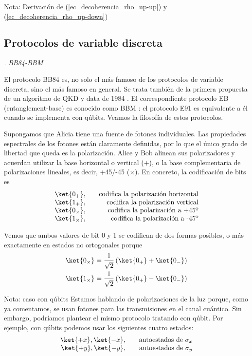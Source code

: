 \documentclass[a4paper,11pt]{book} %
\numberwithin{equation}{chapter}
\def\lp{\left(}
\def\rp{\right)}
\def\subsubiContadorIt{\par\addtocounter{subsubsection}{1}\underline{\it\thesubsubsection.}\hskip0.5cm \setcounter{subsubsubsectionIt}{0}}
\newcommand{\SubsubiIt}[1]{
		\subsubiContadorIt \textit{#1}
	}
\newcounter{subsubsubsectionIt}[subsubsection]
\begin{document}
\begin{mybox_blue}{Nota: Derivación de (\ref{ec_decoherencia_rho_up-up}) y  (\ref{ec_decoherencia_rho_up-down})}
		\subsection{Protocolos de variable discreta} \label{subsec_QKD_discreta}

			\SubsubiIt{BB84-BBM}

El protocolo BB84 es, no solo el más famoso de los protocolos de variable discreta, sino el más famoso en general. Se trata también de la primera propuesta de un algoritmo de QKD y data de 1984 \cite{BB84}. El correspondiente protocolo EB (entanglement-base) es conocido como BBM \cite{BB84_E91_iguales}: el protocolo E91 \cite{Ekert-1991} es equivalente a él cuando se implementa con qúbits. Veamos la filosofía de estos protocolos.

Supongamos que Alicia tiene una fuente de fotones individuales. Las propiedades espectrales de los fotones están claramente definidas, por lo que el único grado de libertad que queda es la polarización. Alice y Bob alinean sus polarizadores y acuerdan utilizar la base horizontal o vertical (+), o la base complementaria de polarizaciones lineales, es decir, +45/-45 ($\times$). En concreto, la codificación de bits es
	\begin{equation} \label{ec_QKD_estados_BB84}
	\begin{array}{rr}
	 \ket{0_+},& \quad \text{codifica la polarización horizontal} \\
	 \ket{1_+},& \quad \text{codifica la polarización vertical} \\
	 \ket{0_\times},& \quad \text{codifica la polarización a +45º} \\
	 \ket{1_\times},& \quad \text{codifica la polarización a -45º} 
	\end{array}
	\end{equation}	

Vemos que ambos valores de bit 0 y 1 se codifican de dos formas posibles, o más exactamente en estados no ortogonales porque
	\begin{align}
	\ket{0_\times} & = \frac{1}{\sqrt{2}} \lp \ket{0_+} + \ket{0_-} \rp \\
	\ket{1_\times} & = \frac{1}{\sqrt{2}} \lp \ket{0_+} - \ket{0_-} \rp
	\end{align}

\begin{mybox_blue}{Nota: caso con qúbits}
Estamos hablando de polarizaciones de la luz porque, como ya comentamos, se usan fotones para las transmisiones en el canal cuántico. Sin embargo, podríamos plantear el mismo protocolo tratando con qúbit. Por ejemplo, con qúbits podemos usar los siguientes cuatro estados:
	\begin{equation} \label{ec_QKD_estados_BB84_xy}
	\begin{array}{rr}
	\ket{+x}, \ket{-x}, & \quad \text{autoestados de } \sigma_x \\
	\ket{+y}, \ket{-y}, & \quad \text{autoestados de } \sigma_y 
	\end{array}
	\end{equation}
\end{mybox_blue}


\end{mybox_blue}
\end{document}
